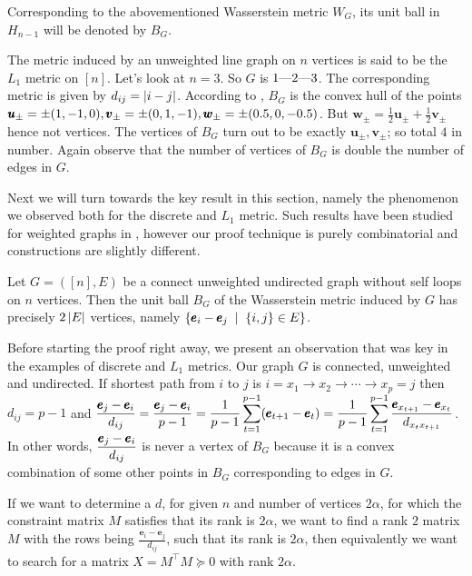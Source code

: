 Corresponding to the abovementioned Wasserstein metric $W_{G}$, its unit ball in $H_{n-1}$ will be denoted by $B_{G}$.

\begin{ex}
The metric induced by an unweighted line graph on $n$ vertices is said to be the $L_{1}$ metric on $[n]$. Let's look at $n=3$. So $G$ is $1\text{\textemdash}2\text{\textemdash}3$. The corresponding metric is given by $d_{ij}=\left| i-j \right|$. According to , $B_{G}$ is the convex hull of the points $\displaystyle \pmb u_{\pm} = \pm(1,-1,0), \pmb v_{\pm}=\pm (0,1,-1), \pmb w_{\pm}=\pm(0.5,0,-0.5)$. But $\pmb w_{\pm} = \frac12 \pmb u_{\pm} +\frac12\pmb v_{\pm}$ hence not vertices. The vertices of $B_{G}$ turn out to be exactly $\pmb u_{\pm},\pmb v_{\pm}$; so total $4$ in number. Again observe that the number of vertices of $B_{G}$ is double the number of edges in $G$.
\end{ex}

Next we will turn towards the key result in this section, namely the phenomenon we observed both for the discrete and $L_{1}$ metric. Such results have been studied for weighted graphs in \cite[Theorem 2, \S 3.1]{finitemetric}, however our proof technique is purely combinatorial and constructions are slightly different.

\begin{thm}
Let $G=([n],E)$ be a connect unweighted undirected graph without self loops on $n$ vertices. Then the unit ball $B_{G}$ of the Wasserstein metric induced by $G$ has precisely $2\left| E \right|$ vertices, namely $\set{\pmb e_{i}-\pmb e_{j}\st \set{i,j}\in E}$.
\end{thm}

Before starting the proof right away, we present an observation that was key in the examples of discrete and $L_{1}$ metrics. Our graph $G$ is connected, unweighted and undirected. If shortest path from $i$ to $j$ is $i = x_{1} \to x_{2}\to\cdots \to x_{p}=j$ then $d_{ij} = p-1$  and $\displaystyle\frac{\pmb e_{j}-\pmb e_{i}}{d_{ij}} = \frac{\pmb e_{j}-\pmb e_{i}}{p-1} = \frac{1}{p-1} \sum\limits_{t=1}^{p-1}(\pmb e_{t+1}-\pmb e_{t}) = \frac{1}{p-1} \sum\limits_{t=1}^{p-1} \frac{\pmb e_{x_{t+1}}-\pmb e_{x_{t}}}{d_{x_{t}x_{t+1}}}$. In other words, $\displaystyle\frac{\pmb e_{j}-\pmb e_{i}}{d_{ij}}$ is never a vertex of $B_{G}$ because it is a convex combination of some other points in $B_{G}$ corresponding to edges in $G$.

{\color{red}If we want to determine a $d$, for given $n$ and number of vertices $2\alpha$, for which the constraint matrix $M$ satisfies that its rank is $2\alpha$, we want to find a rank $2$ matrix $M$ with the rows being $\frac{\pmb e_{i}-\pmb e_{j}}{d_{ij}}$, such that its rank is $2\alpha$, then equivalently we want to search for a matrix $X=M^{\top}M\succeq 0$ with rank $2\alpha$.}

\newpage
\printbibliography


